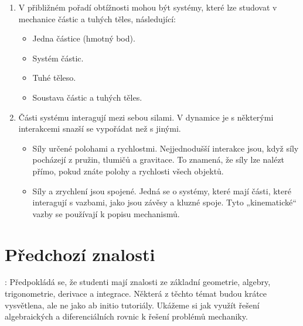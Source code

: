 \documentclass[letterpaper,10pt,english]{jupyterBook}
\begin{document}
\begin{enumerate}
\item {} 
\sphinxAtStartPar
{} V přibližném pořadí obtížnosti mohou být systémy, které lze studovat v mechanice částic a tuhých těles, následující:
\begin{itemize}
\item {} 
\sphinxAtStartPar
Jedna částice (hmotný bod).

\item {} 
\sphinxAtStartPar
Systém částic.

\item {} 
\sphinxAtStartPar
Tuhé těleso.

\item {} 
\sphinxAtStartPar
Soustava částic a tuhých těles.

\end{itemize}

\item {} 
\sphinxAtStartPar
{} Části systému interagují mezi sebou silami. V dynamice je s některými interakcemi snazší se vypořádat než s jinými.
\begin{itemize}
\item {} 
\sphinxAtStartPar
Síly určené polohami a rychlostmi. Nejjednodušší interakce jsou, když síly pocházejí z pružin, tlumičů a gravitace. To znamená, že síly lze nalézt přímo, pokud znáte polohy a rychlosti všech objektů.

\item {} 
\sphinxAtStartPar
Síly a zrychlení jsou spojené. Jedná se o systémy, které mají části, které interagují s vazbami, jako jsou závěsy a kluzné spoje. Tyto „kinematické“ vazby se používají k popisu mechanismů.

\end{itemize}

\end{enumerate}

\sphinxAtStartPar
{}


\chapter{Předchozí znalosti}
\label{\detokenize{Prednasky/0_1_Definice_a_historie_mechaniky:predchozi-znalosti}}
\sphinxAtStartPar
{}: Předpokládá se, že studenti mají  znalosti ze základní geometrie, algebry, trigonometrie, derivace a integrace. Některá z těchto témat budou krátce vysvětlena, ale ne jako ab initio tutoriály. Ukážeme si jak využít řešení algebraických a diferenciálních rovnic k řešení problémů mechaniky.
\end{document}
